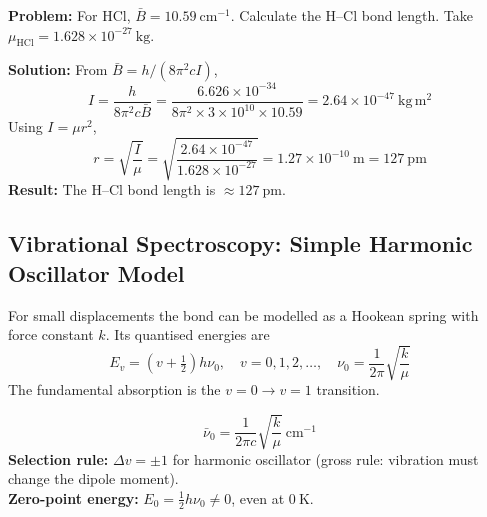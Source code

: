 \documentclass[12pt,a4paper]{article}
\begin{document}
\begin{tcolorbox}[examplebox, title={Solved Example: Bond Length of HCl from Rotational Spectrum}]
\textbf{Problem:} For HCl, $\bar{B}=10.59\ \mathrm{cm^{-1}}$. Calculate the H--Cl bond length. Take $\mu_{\mathrm{HCl}}=1.628\times10^{-27}\ \mathrm{kg}$.

\textbf{Solution:} From $\bar{B}=h/(8\pi^{2}cI)$,
\[
I=\frac{h}{8\pi^{2}c\bar{B}}=\frac{6.626\times10^{-34}}{8\pi^{2}\times 3\times10^{10}\times 10.59}=2.64\times10^{-47}\ \mathrm{kg\,m^{2}}
\]
Using $I=\mu r^{2}$,
\[
r=\sqrt{\frac{I}{\mu}}=\sqrt{\frac{2.64\times10^{-47}}{1.628\times10^{-27}}}=1.27\times10^{-10}\ \mathrm{m}=127\ \mathrm{pm}
\]
\textbf{Result:} The H--Cl bond length is $\approx 127\ \mathrm{pm}$.
\end{tcolorbox}

\subsection{Vibrational Spectroscopy: Simple Harmonic Oscillator Model}
For small displacements the bond can be modelled as a Hookean spring with force constant $k$. Its quantised energies are
\[
E_v=\left(v+\tfrac{1}{2}\right)h\nu_0,\quad v=0,1,2,\ldots,\quad \nu_0=\frac{1}{2\pi}\sqrt{\frac{k}{\mu}}
\]
The fundamental absorption is the $v{=}0\to v{=}1$ transition.

\begin{tcolorbox}[formulabox, title={Vibrational Frequency and Wavenumber}]
\[
\bar{\nu}_0=\frac{1}{2\pi c}\sqrt{\frac{k}{\mu}}\ \mathrm{cm^{-1}}
\]
\textbf{Selection rule:} $\Delta v=\pm 1$ for harmonic oscillator (gross rule: vibration must change the dipole moment).\\
\textbf{Zero-point energy:} $E_0=\tfrac12 h\nu_0\neq 0$, even at $0\ \mathrm{K}$.
\end{tcolorbox}

\begin{tcolorbox}[tikzbox, title={Harmonic Oscillator and Anharmonic (Morse) Potential}]
\centering
{}
\end{tcolorbox}
\end{document}
